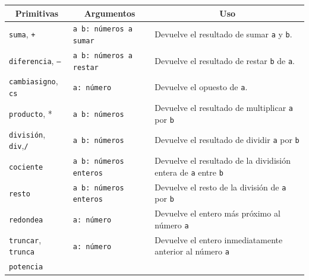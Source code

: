 \begin{center} \begin{longtable}{|m{3cm}|m{2.6cm}|m{9cm}|} \hline 
   \multicolumn{1}{|c|}{\textbf{Primitivas}} &
      \multicolumn{1}{c|}{\textbf{Argumentos}} &
         \multicolumn{1}{c|}{\textbf{Uso}} \\ \endhead \hline 
   \texttt{suma}, \index{suma@\texttt{suma}} \texttt{+} \index{+@\texttt{+}} &
      \texttt{a b: n\'umeros a sumar}&
        Devuelve el resultado de sumar \texttt{a} y \texttt{b}. \\ \hline 
   \texttt{diferencia}, \index{diferencia@\texttt{diferencia}}
       \texttt{--} \index{-@\texttt{--}} & \texttt{a b: n\'umeros a restar} &
        Devuelve el resultado de restar \texttt{b} de \texttt{a}. \\ \hline 
   \texttt{cambiasigno}, \index{cambiasigno@\texttt{cambiasigno}}
     \texttt{cs} \index{cs@\texttt{cs}} & \texttt{a: n\'umero} &
       Devuelve el opuesto \index{Opuesto} de \texttt{a}. \\ \hline 
   \texttt{producto}, \index{producto@\texttt{producto}} 
      * \index{*@\texttt{*}} & \texttt{a b: n\'umeros} &
        Devuelve el resultado de multiplicar \texttt{a} por \texttt{b}\\ \hline
   \texttt{divisi\'on},\index{divisi\'on@\texttt{divisi\'on}}
     \texttt{div},\index{div@\texttt{div}}\texttt{/}\index{/@\texttt{/}} &
        \texttt{a b: n\'umeros} &
        Devuelve el resultado de dividir \texttt{a} por \texttt{b} \\ \hline
   \texttt{cociente} \index{cociente@\texttt{cociente}} &
      \texttt{a b: n\'umeros enteros} & 
        Devuelve el resultado de la dividisi\'on entera de \texttt{a} entre
         \texttt{b} \\ \hline 
   \texttt{resto} \index{resto@\texttt{resto}} & 
      \texttt{a b: n\'umeros enteros} &
        Devuelve el resto de la divisi\'on de \texttt{a} por \texttt{b}
                        \\ \hline 
   \texttt{redondea} \index{redondea@\texttt{redondea}} &
      \texttt{a: n\'umero} &
        Devuelve el entero m\'as pr\'oximo al n\'umero \texttt{a} \\ \hline 
   \texttt{truncar}\index{truncar@\texttt{truncar}},
      \texttt{trunca}\index{truncar@\texttt{trunca}} & \texttt{a: n\'umero} &
        Devuelve el entero inmediatamente anterior al n\'umero \texttt{a}
                        \\ \hline 
   \texttt{potencia} \index{potencia@\texttt{potencia}} & 

\end{longtable}
\end{center}
